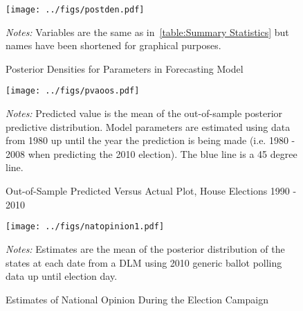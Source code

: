 \documentclass[12pt,final,fleqn]{article}
\theoremstyle{plain}
\begin{document}
\begin{landscape}
\begin{figure}[!ht]
\texttt{[image: ../figs/postden.pdf]}
\vspace{.5cm}
\caption{Posterior Densities for Parameters in Forecasting Model}
\label{fig:Posterior Densities for Parameters in Forecasting Model}
\begin{minipage}{\linewidth}
\footnotesize
\emph{Notes:} Variables are the same as in~\autoref{table:Summary Statistics} but names have been shortened for graphical purposes. 
\end{minipage}
\end{figure}
\end{landscape}

\iffalse
\begin{figure}[!htb]
\texttt{[image: ../figs/pva.pdf]}
\vspace{.5cm}
\caption{In-Sample Predicted Versus Actual Plot, House Elections 1980 - 2008}
\label{fig:In-Sample Predicted Versus Actual Plot, House Elections 1980 - 2008}
\begin{minipage}{\linewidth}
\footnotesize
\emph{Notes:} Predicted value is the mean of the in-sample posterior predictive distribution ($v^{rep}$). Model parameters are estimated using data from 1980 to 2008. The blue line is a 45 degree line.
\end{minipage}
\end{figure}
\fi

\begin{figure}[!htb]
\texttt{[image: ../figs/pvaoos.pdf]}
\vspace{.5cm}
\caption{Out-of-Sample Predicted Versus Actual Plot, House Elections 1990 - 2010}
\label{fig:Out-of-Sample Predicted Versus Actual Plot, House Elections 1990 - 2010}
\begin{minipage}{\linewidth}
\footnotesize
\emph{Notes:} Predicted value is the mean of the out-of-sample posterior predictive distribution. Model parameters are estimated using data from 1980 up until the year the prediction is being made (i.e. 1980 - 2008 when predicting the 2010 election). The blue line is a 45 degree line. 
\end{minipage}
\end{figure}

\begin{figure}[!htb]
\centering
\texttt{[image: ../figs/natopinion1.pdf]}
\vspace{.5cm}
\caption{Estimates of National Opinion During the Election Campaign}
\label{fig:Estimates of National Opinion During the Election Campaign}
\begin{minipage}{\linewidth}
\footnotesize
\emph{Notes:} Estimates are the mean of the posterior distribution of the states at each date from a DLM using 2010 generic ballot polling data up until election day.
\end{minipage}
\end{figure}
\end{document}

